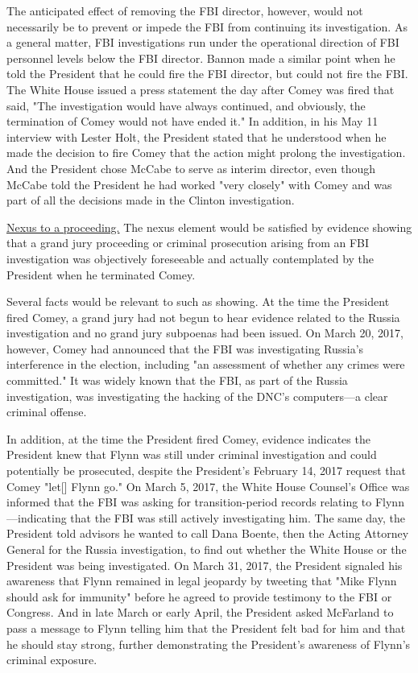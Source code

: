 {The anticipated effect of removing the FBI director, however, would not necessarily be to prevent or impede the FBI from continuing its investigation.
As a general matter, FBI investigations run under the operational direction of FBI personnel levels below the FBI director.
Bannon made a similar point when he told the President that he could fire the FBI director, but could not fire the FBI\null.
The White House issued a press statement the day after Comey was fired that said, "The investigation would have always continued, and obviously, the termination of Comey would not have ended it."
In addition, in his May 11 interview with Lester Holt, the President stated that he understood when he made the decision to fire Comey that the action might prolong the investigation.
And the President chose McCabe to serve as interim director, even though McCabe told the President he had worked "very closely" with Comey and was part of all the decisions made in the Clinton investigation.

\underline{Nexus to a proceeding.}
The nexus element would be satisfied by evidence showing that a grand jury proceeding or criminal prosecution arising from an FBI investigation was objectively foreseeable and actually contemplated by the President when he terminated Comey.

Several facts would be relevant to such as showing.
At the time the President fired Comey, a grand jury had not begun to hear evidence related to the Russia investigation and no grand jury subpoenas had been issued.
On March 20, 2017, however, Comey had announced that the FBI was investigating Russia's interference in the election, including "an assessment of whether any crimes were committed."
It was widely known that the FBI, as part of the Russia investigation, was investigating the hacking of the DNC's computers---a clear criminal offense.

In addition, at the time the President fired Comey, evidence indicates the President knew that Flynn was still under criminal investigation and could potentially be prosecuted, despite the President's February 14, 2017 request that Comey "let[] Flynn go."
On March 5, 2017, the White House Counsel's Office was informed that the FBI was asking for transition-period records relating to Flynn---indicating that the FBI was still actively investigating him.
The same day, the President told advisors he wanted to call Dana Boente, then the Acting Attorney General for the Russia investigation, to find out whether the White House or the President was being investigated.
On March 31, 2017, the President signaled his awareness that Flynn remained in legal jeopardy by tweeting that "Mike Flynn should ask for immunity" before he agreed to provide testimony to the FBI or Congress.
And in late March or early April, the President asked McFarland to pass a message to Flynn telling him that the President felt bad for him and that he should stay strong, further demonstrating the President's awareness of Flynn's criminal exposure.

}
